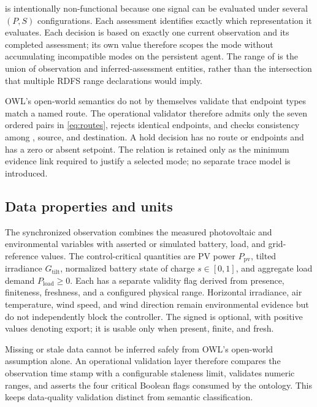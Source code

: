 

 is intentionally non-functional because one signal can be evaluated under several $(P,S)$ configurations. Each assessment identifies exactly which representation it evaluates. Each decision is based on exactly one current observation and its completed assessment; its own  value therefore scopes the mode without accumulating incompatible modes on the persistent agent. The range of  is the union of observation and inferred-assessment entities, rather than the intersection that multiple RDFS range declarations would imply.

OWL's open-world semantics do not by themselves validate that endpoint types match a named route. The operational validator therefore admits only the seven ordered pairs in \autoref{eq:routes}, rejects identical endpoints, and checks consistency among , source, and destination. A hold decision has no route or endpoints and has a zero or absent setpoint. The  relation is retained only as the minimum evidence link required to justify a selected mode; no separate trace model is introduced.

\subsection{Data properties and units}

The synchronized observation combines the measured photovoltaic and environmental variables with asserted or simulated battery, load, and grid-reference values. The control-critical quantities are PV power $P_{\mathrm{pv}}$, tilted irradiance $G_{\mathrm{tilt}}$, normalized battery state of charge $s\in[0,1]$, and aggregate load demand $P_{\mathrm{load}}\geq0$. Each has a separate validity flag derived from presence, finiteness, freshness, and a configured physical range. Horizontal irradiance, air temperature, wind speed, and wind direction remain environmental evidence but do not independently block the controller. The signed  is optional, with positive values denoting export; it is usable only when present, finite, and fresh.

Missing or stale data cannot be inferred safely from OWL's open-world assumption alone. An operational validation layer therefore compares the observation time stamp with a configurable staleness limit, validates numeric ranges, and asserts the four critical Boolean flags consumed by the ontology. This keeps data-quality validation distinct from semantic classification.

